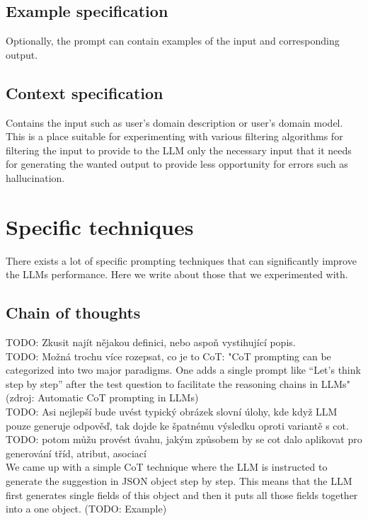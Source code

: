 \subsection{Example specification}
Optionally, the prompt can contain examples of the input and corresponding output.


\subsection{Context specification}
Contains the input such as user's domain description or user's domain model. This is a place suitable for experimenting with various filtering algorithms for filtering the input to provide to the LLM only the necessary input that it needs for generating the wanted output to provide less opportunity for errors such as hallucination.


\section{Specific techniques}

There exists a lot of specific prompting techniques that can significantly improve the LLMs performance. Here we write about those that we experimented with.


\subsection{Chain of thoughts}

TODO: Zkusit najít nějakou definici, nebo aspoň vystihující popis. \\

TODO: Možná trochu více rozepsat, co je to CoT: "CoT prompting can be categorized into two major paradigms. One adds a single prompt like “Let’s think step by step”
 after the test question to facilitate the reasoning chains in LLMs" (zdroj: Automatic CoT prompting in LLMs) \\

TODO: Asi nejlepší bude uvést typický obrázek slovní úlohy, kde když LLM pouze generuje odpověď, tak dojde ke špatnému výsledku oproti variantě s cot. \\

TODO: potom můžu provést úvahu, jakým způsobem by se cot dalo aplikovat pro generování tříd, atribut, asociací \\

We came up with a simple CoT technique where the LLM is instructed to generate the  suggestion in JSON object step by step. This means that the LLM first generates single fields of this object and then it puts all those fields together into a one object. (TODO: Example) \\

